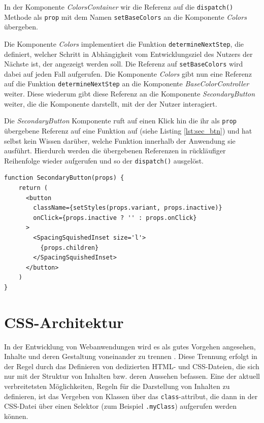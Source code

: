 In der Komponente \textit{ColorsContainer} wir die Referenz auf die \texttt{dispatch()} Methode als \texttt{prop} mit dem Namen \texttt{setBaseColors} an die Komponente \textit{Colors} übergeben.

Die Komponente \textit{Colors} implementiert die Funktion \texttt{determineNextStep}, die definiert, welcher Schritt in Abhängigkeit vom Entwicklungsziel des Nutzers der Nächste ist, der angezeigt werden soll. Die Referenz auf \texttt{setBaseColors} wird dabei auf jeden Fall aufgerufen. Die Komponente \textit{Colors} gibt nun eine Referenz auf die Funktion \texttt{determineNextStep} an die Komponente \textit{BaseColorController} weiter. Diese wiederum gibt diese Referenz an die Komponente \textit{SecondaryButton} weiter, die die Komponente darstellt, mit der der Nutzer interagiert.

Die \textit{SecondaryButton} Komponente ruft auf einen Klick hin die ihr als \texttt{prop} übergebene Referenz auf eine Funktion auf (siehe Listing \ref{lst:sec_btn}) und hat selbst kein Wissen darüber, welche Funktion innerhalb der Anwendung sie ausführt. Hierdurch werden die übergebenen Referenzen in rückläufiger Reihenfolge wieder aufgerufen und so der \texttt{dispatch()} ausgelöst.

\begin{lstlisting}[caption={Aufruf der übergebenen Funktion in der Komponente \textit{SecondaryButton}}, label=lst:sec_btn]
  function SecondaryButton(props) {
    return (
      <button
        className={setStyles(props.variant, props.inactive)}
        onClick={props.inactive ? '' : props.onClick}
      >
        <SpacingSquishedInset size='l'>
          {props.children}
        </SpacingSquishedInset>
      </button>
    )
}
\end{lstlisting}

\section{CSS-Architektur}
In der Entwicklung von Webanwendungen wird es als gutes Vorgehen angesehen, Inhalte und deren Gestaltung voneinander zu trennen \cite[S. 56]{goodman2002dynamic}. Diese Trennung erfolgt in der Regel durch das Definieren von dedizierten HTML- und CSS-Dateien, die sich nur mit der Struktur von Inhalten bzw. deren Aussehen befassen.
Eine der aktuell verbreitetsten Möglichkeiten, Regeln für die Darstellung von Inhalten zu definieren, ist das Vergeben von Klassen über das \texttt{class}-attribut, die dann in der CSS-Datei über einen Selektor (zum Beispiel \texttt{.myClass}) aufgerufen werden können.

